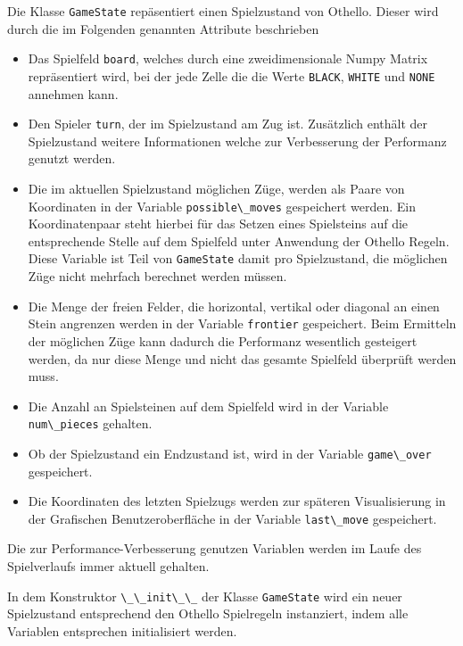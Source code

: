 Die Klasse \passthrough{\lstinline!GameState!} repäsentiert einen
Spielzustand von Othello. Dieser wird durch die im Folgenden genannten
Attribute beschrieben

\begin{itemize}
\tightlist
\item
  Das Spielfeld \passthrough{\lstinline!board!}, welches durch eine
  zweidimensionale Numpy Matrix repräsentiert wird, bei der jede Zelle
  die die Werte \passthrough{\lstinline!BLACK!},
  \passthrough{\lstinline!WHITE!} und \passthrough{\lstinline!NONE!}
  annehmen kann.
\item
  Den Spieler \passthrough{\lstinline!turn!}, der im Spielzustand am Zug
  ist. Zusätzlich enthält der Spielzustand weitere Informationen welche
  zur Verbesserung der Performanz genutzt werden.
\item
  Die im aktuellen Spielzustand möglichen Züge, werden als Paare von
  Koordinaten in der Variable \passthrough{\lstinline!possible\_moves!}
  gespeichert werden. Ein Koordinatenpaar steht hierbei für das Setzen
  eines Spielsteins auf die entsprechende Stelle auf dem Spielfeld unter
  Anwendung der Othello Regeln. Diese Variable ist Teil von
  \passthrough{\lstinline!GameState!} damit pro Spielzustand, die
  möglichen Züge nicht mehrfach berechnet werden müssen.
\item
  Die Menge der freien Felder, die horizontal, vertikal oder diagonal an
  einen Stein angrenzen werden in der Variable
  \passthrough{\lstinline!frontier!} gespeichert. Beim Ermitteln der
  möglichen Züge kann dadurch die Performanz wesentlich gesteigert
  werden, da nur diese Menge und nicht das gesamte Spielfeld überprüft
  werden muss.
\item
  Die Anzahl an Spielsteinen auf dem Spielfeld wird in der Variable
  \passthrough{\lstinline!num\_pieces!} gehalten.
\item
  Ob der Spielzustand ein Endzustand ist, wird in der Variable
  \passthrough{\lstinline!game\_over!} gespeichert.
\item
  Die Koordinaten des letzten Spielzugs werden zur späteren
  Visualisierung in der Grafischen Benutzeroberfläche in der Variable
  \passthrough{\lstinline!last\_move!} gespeichert.
\end{itemize}

Die zur Performance-Verbesserung genutzen Variablen werden im Laufe des
Spielverlaufs immer aktuell gehalten.

In dem Konstruktor \passthrough{\lstinline!\_\_init\_\_!} der Klasse
\passthrough{\lstinline!GameState!} wird ein neuer Spielzustand
entsprechend den Othello Spielregeln instanziert, indem alle Variablen
entsprechen initialisiert werden.


